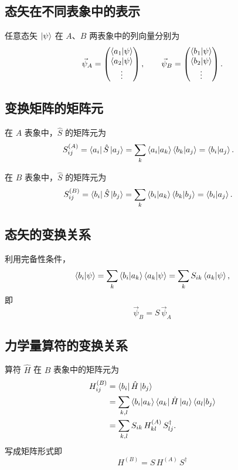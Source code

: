 \documentclass[12pt,a4paper]{article}
\begin{document}
\subsection{态矢在不同表象中的表示}

任意态矢 $\ket{\psi}$ 在 $A$、$B$ 两表象中的列向量分别为
\[
\vec{\psi}_A=\begin{pmatrix}\braket{a_1|\psi}\\ \braket{a_2|\psi}\\ \vdots\end{pmatrix},
\qquad
\vec{\psi}_B=\begin{pmatrix}\braket{b_1|\psi}\\ \braket{b_2|\psi}\\ \vdots\end{pmatrix}.
\]

\subsection{变换矩阵的矩阵元}

在 $A$ 表象中，$\hat{S}$ 的矩阵元为
\begin{align*}
S_{ij}^{(A)}&=\bra{a_i}\hat{S}\ket{a_j}
=\sum_k\braket{a_i|a_k}\braket{b_k|a_j}
=\braket{b_i|a_j}.
\end{align*}

在 $B$ 表象中，$\hat{S}$ 的矩阵元为
\begin{align*}
S_{ij}^{(B)}&=\bra{b_i}\hat{S}\ket{b_j}
=\sum_k\braket{b_i|a_k}\braket{b_k|b_j}
=\braket{b_i|a_j}.
\end{align*}

\subsection{态矢的变换关系}

利用完备性条件，
\[
\braket{b_i|\psi}=\sum_k\braket{b_i|a_k}\braket{a_k|\psi}
=\sum_k S_{ik}\braket{a_k|\psi},
\]
即
\[
\boxed{\;\vec{\psi}_B=S\,\vec{\psi}_A\;}
\]

\subsection{力学量算符的变换关系}

算符 $\hat{H}$ 在 $B$ 表象中的矩阵元为
\begin{align*}
H_{ij}^{(B)}&=\bra{b_i}\hat{H}\ket{b_j}\\
&=\sum_{k,l}\braket{b_i|a_k}\bra{a_k}\hat{H}\ket{a_l}\braket{a_l|b_j}\\
&=\sum_{k,l}S_{ik}\,H_{kl}^{(A)}\,S_{lj}^{\dagger}.
\end{align*}
写成矩阵形式即
\[
\boxed{\;H^{(B)}=S\,H^{(A)}\,S^{\dagger}\;}
\]
\end{document}
